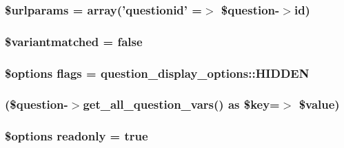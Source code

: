 \label{questiontestrun_8php_ada57e7bb7c152edad18fe2f166188691}
\hypertarget{questiontestrun_8php_a1aa950c4029aca228dd33a4b27109e00}{
\subsubsection[{\$urlparams}]{\setlength{\rightskip}{0pt plus 5cm}\$urlparams = array('questionid' =$>$ \$question-\/$>$id)}}
\label{questiontestrun_8php_a1aa950c4029aca228dd33a4b27109e00}
\hypertarget{questiontestrun_8php_a097507b0d1ee2970b0b9c450e453280d}{
\subsubsection[{\$variantmatched}]{\setlength{\rightskip}{0pt plus 5cm}\$variantmatched = false}}
\label{questiontestrun_8php_a097507b0d1ee2970b0b9c450e453280d}
\hypertarget{questiontestrun_8php_adcb2a3f70c8c91986e6561111d0d9b0f}{
\subsubsection[{flags}]{\setlength{\rightskip}{0pt plus 5cm}\$options {\bf flags} = question\_\-display\_\-options::HIDDEN}}
\label{questiontestrun_8php_adcb2a3f70c8c91986e6561111d0d9b0f}
\hypertarget{questiontestrun_8php_afd34bd4e31a3575bb885c2bd1822421e}{
\subsubsection[{foreach}]{(\$question-\/$>$get\_\-all\_\-question\_\-vars() as \$key=$>$ \$value)}}
\label{questiontestrun_8php_afd34bd4e31a3575bb885c2bd1822421e}
\hypertarget{questiontestrun_8php_a78c524eb69c50edb232234e0bc6b4de9}{
\subsubsection[{readonly}]{\setlength{\rightskip}{0pt plus 5cm}\$options {\bf readonly} = true}}
